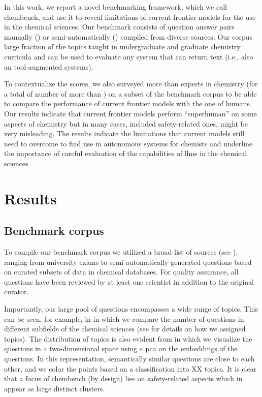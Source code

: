 \documentclass[11pt, oneside]{article}
\begin{document}
In this work, we report a novel benchmarking framework, which we call chembench, and use it to reveal limitations of current frontier models for the use in the chemical sciences.
Our benchmark consists of \unskip question answer pairs manually (\unskip) or semi-automatically (\unskip) compiled from diverse sources.
Our corpus large fraction of the topics taught in undergraduate and graduate chemistry curricula and can be used to evaluate any system that can return text (i.e., also an tool-augmented systems).

To contextualize the scores, we also surveyed more than  experts in chemistry (for a total of number of more than \unskip) on a subset of the benchmark corpus to be able to compare the performance of current frontier models with the one of humans.
Our results indicate that current frontier models perform \enquote{superhuman} on some aspects of chemistry but in many cases, included safety-related ones, might be very misleading.
The results indicate the limitations that current models still need to overcome to find use in autonomous systems for chemists and underline the importance of careful evaluation of the capabilities of \glspl{llm} in the chemical sciences.

\section{Results}

\subsection{Benchmark corpus}

To compile our benchmark corpus we utilized a broad list of sources (see ), ranging from university exams to semi-automatically generated questions based on curated subsets of data in chemical databases.
For quality assurance, all questions have been reviewed by at least one scientist in addition to the original curator.

Importantly, our large pool of questions encompasses a wide range of topics.
This can be seen, for example, in  in which we compare the number of questions in different subfields of the chemical sciences (see  for details on how we assigned topics).
The distribution of topics is also evident from  in which we visualize the questions in a two-dimensional space using a \gls{pca} on the embeddings of the questions.
In this representation, semantically similar questions are close to each other, and we color the points based on a classification into XX topics. 
It is clear that a focus of chembench (by design) lies on safety-related aspects which in  appear as large distinct clusters.
\end{document}
